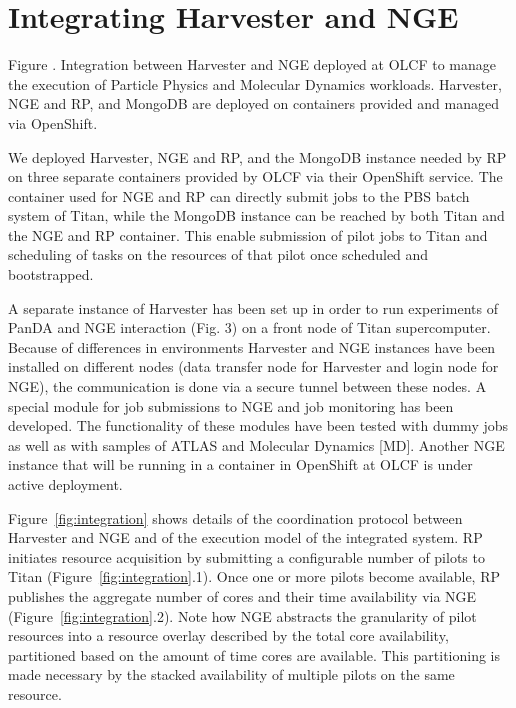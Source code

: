 \documentclass{webofc}
\begin{document}
\section{Integrating Harvester and NGE}

Figure \number. Integration between Harvester and NGE deployed at OLCF to manage the execution of Particle Physics and Molecular Dynamics workloads. Harvester, NGE and RP, and MongoDB are deployed on containers provided and managed via OpenShift.

We deployed Harvester, NGE and RP, and the MongoDB instance needed by RP on three separate containers provided by OLCF via their OpenShift service. The container used for NGE and RP can directly submit jobs to the PBS batch system of Titan, while the MongoDB instance can be reached by both Titan and the NGE and RP container. This enable submission of pilot jobs to Titan and scheduling of tasks on the resources of that pilot once scheduled and bootstrapped.

A separate instance of Harvester has been set up in order to run experiments of PanDA and NGE interaction (Fig. 3) on a front node of Titan supercomputer. Because of differences in environments Harvester and NGE instances have been installed on different nodes (data transfer node for Harvester and login node for NGE), the communication is done via a secure tunnel between these nodes. A special module for job submissions to NGE and job monitoring has been developed. The functionality of these modules have been tested with dummy jobs as well as with samples of ATLAS and Molecular Dynamics [MD]. Another NGE instance that will be running in a container in OpenShift at OLCF is under active deployment.

Figure~\ref{fig:integration} shows details of the coordination protocol between Harvester and NGE and of the execution model of the integrated system. RP initiates resource acquisition by submitting a configurable number of pilots to Titan (Figure~\ref{fig:integration}.1). Once one or more pilots become available, RP publishes the aggregate number of cores and their time availability via NGE (Figure~\ref{fig:integration}.2). Note how NGE abstracts the granularity of pilot resources into a resource overlay described by the total core availability, partitioned based on the amount of time cores are available. This partitioning is made necessary by the stacked availability of multiple pilots on the same resource. 
\end{document}
